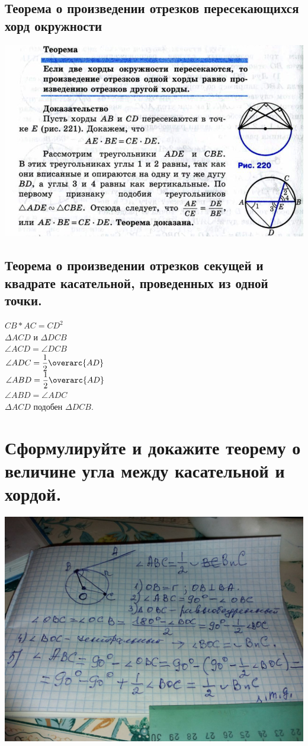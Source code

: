 \documentclass[12pt, letterpaper]{article}
\begin{document}
\subsection{Теорема о произведении отрезков пересекающихся хорд окружности}
\includegraphics[scale=0.3]{photo10.jpg}
\subsection{Теорема о произведении отрезков секущей и квадрате касательной, проведенных из одной точки.}
\textbf{$CB*AC=CD^2$ \\}
$\Delta ACD $ и $ \Delta DCB $ \\
$ \angle ACD = \angle DCB $ \\ 
$ \angle ADC  = \dfrac{1}{2} \overarc{AD} $ \\
$ \angle ABD  = \dfrac{1}{2} \overarc{AD} $ \\
$ \angle ABD  = \angle ADC $ \\
$ \Delta ACD $ подобен $ \Delta DCB $. \\


\section {Сформулируйте и докажите теорему о величине угла между касательной и хордой.}
\includegraphics[scale=0.3]{asset-2.png} \\
\end{document}
